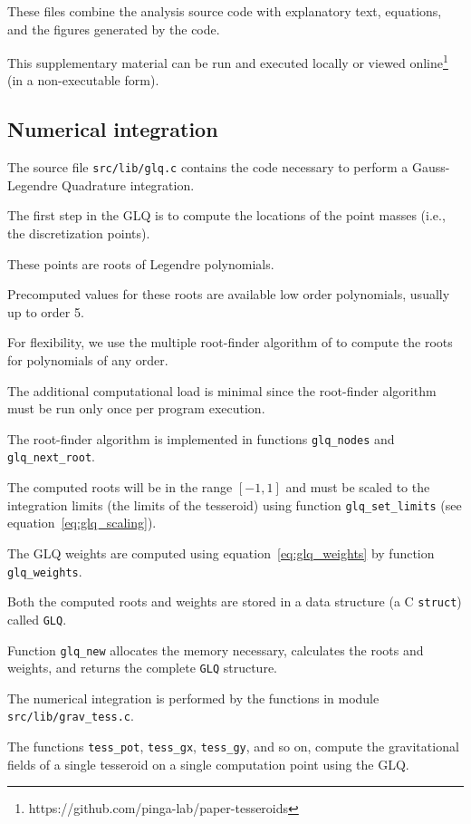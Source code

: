 \documentclass[paper,twocolumn]{geophysics}
\begin{document}
These files combine the analysis source code
with explanatory text, equations, and the figures generated by the code.

This supplementary material can be run and executed locally or viewed
online\footnote{https://github.com/pinga-lab/paper-tesseroids}
(in a non-executable form).


\subsection{Numerical integration}

The source file \texttt{src/lib/glq.c} contains the code necessary to perform a
Gauss-Legendre Quadrature integration.

The first step in the GLQ is to compute the
locations of the point masses (i.e., the discretization points).

These points are roots of Legendre polynomials.

Precomputed values for these roots are available low order polynomials,
usually up to order 5.

For flexibility, we use the multiple root-finder algorithm of
\citet{Barrera-Figueroa2006} to compute the roots for polynomials of any order.

The additional computational load is minimal since the root-finder algorithm
must be run only once per program execution.

The root-finder algorithm is implemented in functions \texttt{glq\_nodes} and
\texttt{glq\_next\_root}.

The computed roots will be in the range $[-1, 1]$
and must be scaled to the integration limits (the limits of the tesseroid)
using function \texttt{glq\_set\_limits} (see equation~\ref{eq:glq_scaling}).

The GLQ weights are computed using equation~\ref{eq:glq_weights} by function
\texttt{glq\_weights}.

Both the computed roots and weights are stored in a data structure (a C
\texttt{struct}) called \texttt{GLQ}.

Function \texttt{glq\_new} allocates the memory necessary,
calculates the roots and weights,
and returns the complete \texttt{GLQ} structure.



The numerical integration is performed by the functions in module
\texttt{src/lib/grav\_tess.c}.

The functions \texttt{tess\_pot}, \texttt{tess\_gx}, \texttt{tess\_gy},
and so on, compute the gravitational fields of a single tesseroid on a single
computation point using the GLQ.
\end{document}
